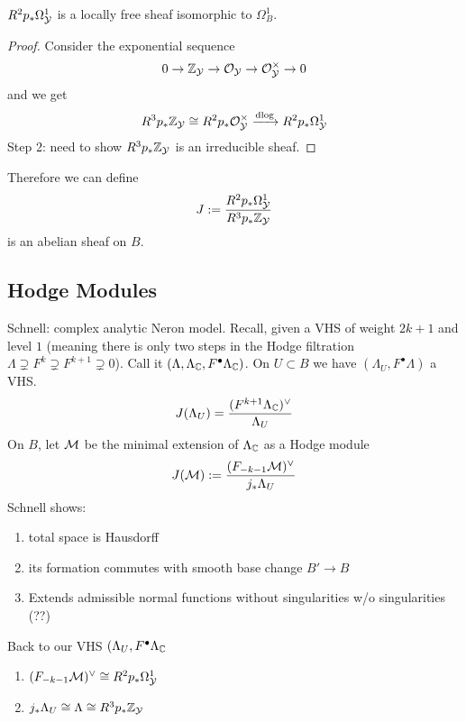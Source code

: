\documentclass[12pt]{article}
\begin{document}
\begin{rmk}
$R^2 p_* \Omega^1_{\mathcal{Y}}$ is a locally free sheaf isomorphic to $\Omega^1_B$.
\end{rmk}

\begin{proof}
Consider the exponential sequence
\[ 0 \to \mathbb{Z}_{\mathcal{Y}} \to \mathcal{O}_{\mathcal{Y}} \to \mathcal{O}_{\mathcal{Y}}^\times \to 0 \]
and we get
\[ R^3 p_* \mathbb{Z}_{\mathcal{Y}} \cong R^2 p_* \mathcal{O}_{\mathcal{Y}}^\times \xrightarrow{\mathrm{d}{\log}} R^2 p_* \Omega_{\mathcal{Y}}^1 \]
Step 2: need to show $R^3 p_* \mathbb{Z}_{\mathcal{Y}}$ is an irreducible sheaf. 
\end{proof}

Therefore we can define
\[ J := \frac{R^2 p_* \Omega^1_{\mathcal{Y}}}{R^3 p_* \mathbb{Z}_{\mathcal{Y}}} \]
is an abelian sheaf on $B$. 

\subsection{Hodge Modules}

Schnell: complex analytic Neron model. Recall, given a VHS of weight $2k + 1$ and level $1$ (meaning there is only two steps in the Hodge filtration $\Lambda \supsetneq F^k \supsetneq F^{k+1} \supsetneq 0$). Call it $(\Lambda, \Lambda_{\mathbb{C}}, F^\bullet \Lambda_{\mathbb{C}})$. On $U \subset B$ we have $(\Lambda_U, F^\bullet \Lambda)$ a VHS.
\[ J(\Lambda_U) = \frac{(F^{k+1} \Lambda_{\mathbb{C}})^{\vee}}{\Lambda_U} \]
On $B$, let $\mathcal{M}$ be the minimal extension of $\Lambda_{\mathbb{C}}$ as a Hodge module 
\[ J(\mathcal{M}) := \frac{(F_{-k-1} \mathcal{M})^{\vee}}{j_* \Lambda_U} \]
Schnell shows:
\begin{enumerate}
\item total space is Hausdorff
\item its formation commutes with smooth base change $B' \to B$
\item Extends admissible normal functions without singularities w/o singularities (??) 
\end{enumerate}

\begin{prop}
Back to our VHS $(\Lambda_U, F^\bullet \Lambda_{\mathbb{C}}$ 
\begin{enumerate}
\item $(F_{-k-1} \mathcal{M})^\vee \cong R^2 p_* \Omega_{\mathcal{Y}}^1$
\item $j_* \Lambda_U \cong \Lambda \cong R^3 p_* \mathbb{Z}_{\mathcal{Y}}$
\end{enumerate}
\end{prop}

\newcommand{\DR}{\mathrm{DR}}
\end{document}
